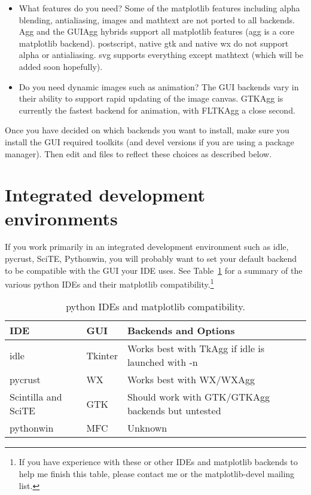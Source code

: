 \documentclass[twoside]{book}
\begin{document}
\begin{itemize}
\item What features do you need?  Some of the matplotlib features
  including alpha blending, antialiasing, images and mathtext are not
  ported to all backends.  Agg and the GUIAgg hybrids support all
  matplotlib features (agg is a core matplotlib backend).  postscript,
  native gtk and native wx do not support alpha or antialiasing.  svg
  supports everything except mathtext (which will be added soon
  hopefully).

\item Do you need dynamic images such as animation?  The GUI backends
  vary in their ability to support rapid updating of the image
  canvas.  GTKAgg is currently the fastest backend for animation,
  with FLTKAgg a close second.
\end{itemize}

Once you have decided on which backends you want to install, make sure
you install the GUI required toolkits (and devel versions if you are
using a package manager).  Then edit  and
 files to reflect these choices as described
below.

\section{Integrated development environments}
\label{sec:ides}

If you work primarily in an integrated development environment such as
idle, pycrust, SciTE, Pythonwin, you will probably want to set your
default backend to be compatible with the GUI your IDE uses. See
Table~\ref{tab:ides} for a summary of the various python IDEs and
their matplotlib compatibility.\footnote{If you have experience with
  these or other IDEs and matplotlib backends to help me finish this
  table, please contact me or the matplotlib-devel mailing list.}

\begin{table}[htbp]
  \centering
  \begin{tabular}[t]{|l|l|l|}\hline
  IDE & GUI & Backends and Options\\\hline
  idle & Tkinter & Works best with TkAgg if idle is launched with -n\\
  pycrust & WX & Works best with WX/WXAgg\\
  Scintilla and SciTE & GTK & Should work with GTK/GTKAgg backends but untested\\
  pythonwin & MFC & Unknown\\\hline

  \end{tabular}
  \caption{\label{tab:ides}python IDEs and matplotlib compatibility.
  }
\end{table}
\end{document}
